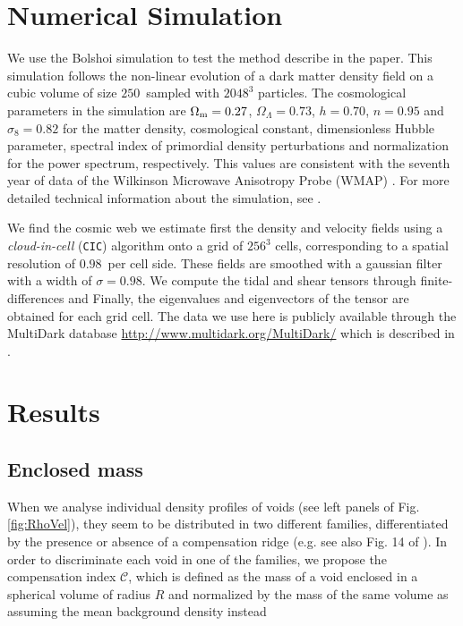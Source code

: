 \documentclass[a4,useAMS,usenatbib,usegraphicx]{mn2e}
\newcommand{\hMpc}{{\ifmmode{h^{-1}{\rm Mpc}}\else{$h^{-1}$Mpc}\fi}}
\begin{document}
\section{Numerical Simulation}
\label{sec:simulations}

We use the Bolshoi simulation to test the method describe in the
paper. 
This simulation follows the non-linear evolution of a dark
matter density field on a cubic volume of  size $250$\hMpc\ sampled
with $2048^3$ particles. 
The cosmological parameters in the simulation are $\Omega_{\rm m}=0.27$,  $\Omega_{\Lambda}  =0.73$, $h=0.70$,
$n=0.95$ and $\sigma_{8}=0.82$ for the matter density,   cosmological
constant, dimensionless Hubble parameter, spectral index of
primordial density perturbations and normalization for the power
spectrum, respectively. 
This values are consistent with the seventh year of data of the Wilkinson 
Microwave Anisotropy Probe (WMAP) \citep{Jarosik11}. 
For more detailed  technical information about the simulation, see
\citet{Klypin11}. 


We find the cosmic web we estimate first the density and velocity
fields using a  \textit{cloud-in-cell} (\texttt{CIC}) algorithm onto a grid of $256^3$ 
cells, corresponding to a spatial resolution of $0.98$\hMpc\ per cell
side.  
These fields are smoothed with a gaussian filter with a width of
$\sigma=0.98$\hMpc.
We compute the tidal and shear tensors through finite-differences and
Finally, the eigenvalues and eigenvectors of the tensor are
obtained for each grid cell.
The data we use here is publicly available through the MultiDark
database \url{http://www.multidark.org/MultiDark/} which is described
in \citet{Riebe11}.


\section{Results}
\label{sec:results}


\subsection{Enclosed mass}
\label{subsec:enclosedmass}


When we analyse individual density profiles of voids (see left panels of
Fig. \ref{fig:RhoVel}), they seem to be distributed in two different 
families, differentiated by the presence or absence of a compensation 
ridge (e.g. see also Fig. 14 of \citet{Colberg05}). In order to 
discriminate each void in one of the families, we propose the compensation 
index $\mathcal{C}$, which is defined as the mass of a void enclosed in a 
spherical volume of radius $R$ and normalized by the mass of the same 
volume as assuming the mean background density instead
\end{document}
